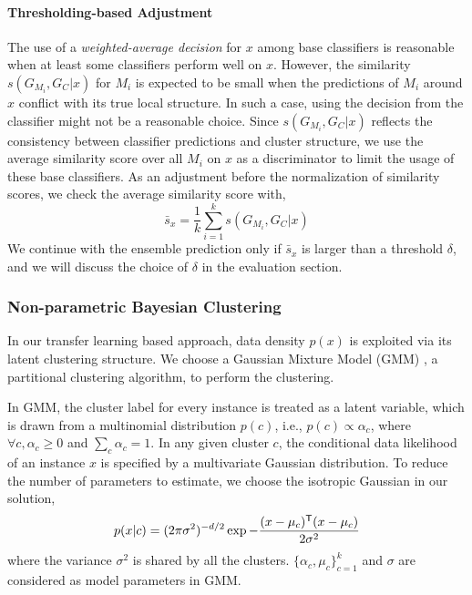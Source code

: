\paragraph{Thresholding-based Adjustment}
The use of a \emph{weighted-average decision} for $x$ among base classifiers is reasonable when at least some classifiers perform well on $x$.
However, the similarity $s(G_{M_i}, G_C|x)$ for $M_i$ is expected to be small when the predictions of $M_i$ around $x$ conflict with its true local structure.
In such a case, using the decision from the classifier might not be a reasonable choice.
Since $s(G_{M_i}, G_C|x)$ reflects the consistency between classifier predictions and cluster structure, we use the average similarity score over all $M_i$ on $x$ as a discriminator to limit the usage of these base classifiers.
As an adjustment before the normalization of similarity scores, we check the average similarity score with,
\begin{equation}\label{ave_sim}
 \bar s_x = \frac {1}{k}\sum_{i=1}^k s(G_{M_i}, G_C|x)
\end{equation}
We continue with the ensemble prediction only if $\bar s_x$ is larger than a threshold $\delta$, and we will discuss the choice of $\delta$ in the evaluation section.


\subsubsection{Non-parametric Bayesian Clustering}
\label{sec_clustering}
In our transfer learning based approach, data density $p(x)$ is exploited via its latent clustering structure. We choose a Gaussian Mixture Model (GMM) \cite{zivkovic2004improved}, a partitional clustering algorithm, to perform the clustering.

In GMM, the cluster label for every instance is treated as a latent variable, which is drawn from a multinomial distribution $p(c)$, i.e., $p(c)\propto\alpha_c$, where $\forall c, \alpha_c\ge0$ and $\sum_c\alpha_c=1$. In any given cluster $c$, the conditional data likelihood of an instance $x$ is specified by a multivariate Gaussian distribution. To reduce the number of parameters to estimate, we choose the isotropic Gaussian in our solution,
\begin{equation}
p(x|c)=(2\pi\sigma^2)^{-d/2}\exp{-\frac{(x-\mu_c)^{\mathsf{T}}(x-\mu_c)}{2\sigma^2}}
\end{equation}
where the variance $\sigma^2$ is shared by all the clusters. $\{\alpha_c, \mu_c\}^k_{c=1}$ and $\sigma$ are considered as model parameters in GMM.

